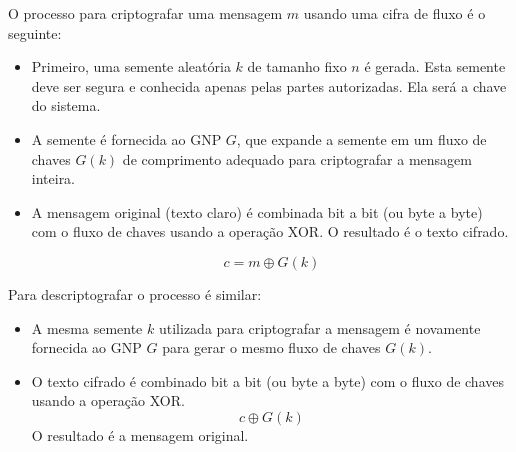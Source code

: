 O processo para criptografar uma mensagem $m$ usando uma cifra de fluxo é o seguinte:
\begin{itemize}
\item Primeiro, uma semente aleatória $k$ de tamanho fixo $n$ é gerada.
  Esta semente deve ser segura e conhecida apenas pelas partes autorizadas.
  Ela será a chave do sistema.
\item A semente é fornecida ao GNP $G$, que expande a semente em um fluxo de chaves $G(k)$ de comprimento adequado para criptografar a mensagem inteira.
\item A mensagem original (texto claro) é combinada bit a bit (ou byte a byte) com o fluxo de chaves usando a operação XOR.
  O resultado é o texto cifrado.

  \begin{displaymath}
    c = m \oplus G(k)
  \end{displaymath}
\end{itemize}

Para descriptografar o processo é similar:
\begin{itemize}
\item A mesma semente $k$ utilizada para criptografar a mensagem é novamente fornecida ao GNP $G$ para gerar o mesmo fluxo de chaves $G(k)$.
\item O texto cifrado é combinado bit a bit (ou byte a byte) com o fluxo de chaves usando a operação XOR.
  \begin{displaymath}
    c \oplus G(k)
  \end{displaymath}
  O resultado é a mensagem original.
\end{itemize}

